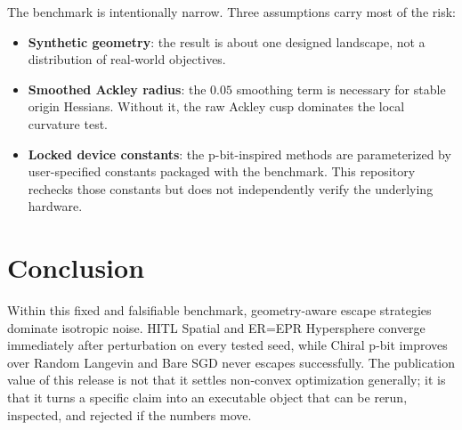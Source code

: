 \documentclass[11pt]{article}
\begin{document}
The benchmark is intentionally narrow. Three assumptions carry most of the risk:
\begin{itemize}[leftmargin=1.5em]
  \item \textbf{Synthetic geometry}: the result is about one designed landscape, not a distribution of real-world objectives.
  \item \textbf{Smoothed Ackley radius}: the \(0.05\) smoothing term is necessary for stable origin Hessians. Without it, the raw Ackley cusp dominates the local curvature test.
  \item \textbf{Locked device constants}: the p-bit-inspired methods are parameterized by user-specified constants packaged with the benchmark. This repository rechecks those constants but does not independently verify the underlying hardware.
\end{itemize}

\section{Conclusion}

Within this fixed and falsifiable benchmark, geometry-aware escape strategies dominate isotropic noise. HITL Spatial and ER=EPR Hypersphere converge immediately after perturbation on every tested seed, while Chiral p-bit improves over Random Langevin and Bare SGD never escapes successfully. The publication value of this release is not that it settles non-convex optimization generally; it is that it turns a specific claim into an executable object that can be rerun, inspected, and rejected if the numbers move.



\end{document}
